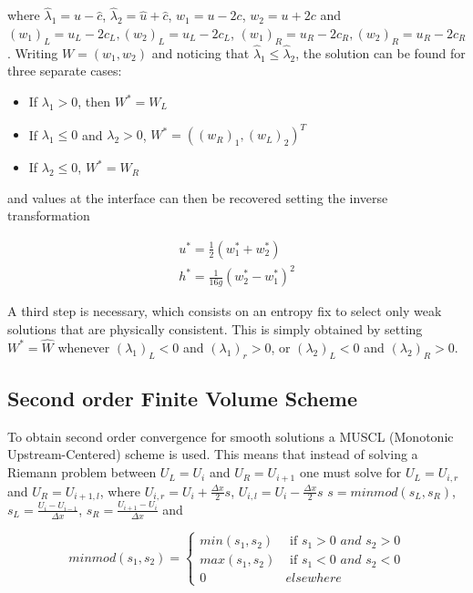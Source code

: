 \documentclass{article}
\begin{document}
\noindent where $\hat \lambda_1 = \hat u - \hat c$, $\hat \lambda_2 = \hat u + \hat c$, $w_1 = u-2c$, $w_2 = u+2c$ and $ (w_1)_L = u_L - 2c_L, (w_2)_L = u_L - 2c_L$, $ (w_1)_R = u_R - 2c_R, (w_2)_R = u_R - 2c_R$. Writing $W=(w_1,w_2)$ and noticing that $\hat \lambda_1 \leq \hat \lambda_2$, the solution can be found for three separate cases:

\begin{itemize}
	\item If $\lambda_1 > 0$, then $W^* = W_L$
	\item If $\lambda_1 \leq 0 $ and $\lambda_2>0$, $W^* = ((w_R)_1, (w_L)_2)^T$
	\item If $\lambda_2\leq 0 $, $W^* = W_R$
\end{itemize}

\noindent and values at the interface can then be recovered setting the inverse transformation 

\begin{equation}
	\begin{split}
	u^* = \frac{1}{2}(w^*_1+w^*_2) \\
	h^* = \frac{1}{16g}(w^*_2-w^*_1)^2
	\end{split}	
	\label{serre:riemman_solution}
\end{equation}

A third step is necessary, which consists on an entropy fix to select only weak solutions that are physically consistent. This is simply obtained by setting $W^* = \hat W$ whenever $(\lambda_1)_L < 0$ and $(\lambda_1)_r >0$, or $(\lambda_2)_L < 0 $ and $(\lambda_2)_R>0$.

\subsection{Second order Finite Volume Scheme}

To obtain second order convergence for smooth solutions a MUSCL (Monotonic Upstream-Centered) scheme is used. This means that instead of solving a Riemann problem between $U_L=U_{i}$ and $U_R=U_{i+1}$ one must solve for 
$U_L = U_{i,r}$ and $U_R=U_{i+1,l}$, 
where $U_{i,r} = U_i + \frac{\Delta x}{2} s$, 
$U_{i,l} = U_i - \frac{\Delta x}{2} s$  $s = minmod(s_L,s_R)$, 
$s_L = \frac{U_{i}-U_{i-1}}{\Delta x}$, 
$s_R = \frac{U_{i+1}-U_{i}}{\Delta x}$ and

\begin{equation}
	minmod(s_1,s_2) = \begin{cases}
		min(s_1,s_2) & \text{ if } s_1>0 \textit{ and } s_2>0 \\
		max(s_1,s_2) & \text{ if } s_1<0 \textit{ and } s_2<0 \\
		0 & elsewhere
	\end{cases}
\end{equation}


\end{document}
